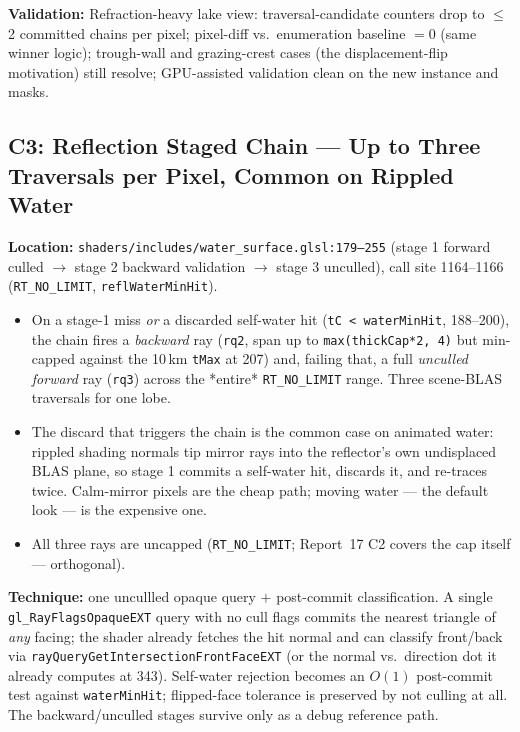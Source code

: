 \documentclass[11pt,a4paper]{article}
\begin{document}
\begin{tcolorbox}[promptbox={Prompt: Split the Scene Instance by Content and Restore Opaque Refraction}]
\textbf{Validation:} Refraction-heavy lake view: traversal-candidate counters drop to $\leq$2 committed chains per pixel; pixel-diff vs.\ enumeration baseline $=0$ (same winner logic); trough-wall and grazing-crest cases (the displacement-flip motivation) still resolve; GPU-assisted validation clean on the new instance and masks.
\end{tcolorbox}

\subsection{C3: Reflection Staged Chain --- Up to Three Traversals per Pixel, Common on Rippled Water}

\textbf{Location:} \texttt{shaders/includes/water\_surface.glsl:179--255} (stage 1 forward culled $\rightarrow$ stage 2 backward validation $\rightarrow$ stage 3 unculled), call site 1164--1166 (\texttt{RT\_NO\_LIMIT}, \texttt{reflWaterMinHit}).

\begin{itemize}
    \item On a stage-1 miss \emph{or} a discarded self-water hit (\texttt{tC < waterMinHit}, 188--200), the chain fires a \emph{backward} ray (\texttt{rq2}, span up to \texttt{max(thickCap*2, 4)} but min-capped against the 10\,km \texttt{tMax} at 207) and, failing that, a full \emph{unculled forward} ray (\texttt{rq3}) across the *entire* \texttt{RT\_NO\_LIMIT} range. Three scene-BLAS traversals for one lobe.
    \item The discard that triggers the chain is the common case on animated water: rippled shading normals tip mirror rays into the reflector's own undisplaced BLAS plane, so stage 1 commits a self-water hit, discards it, and re-traces twice. Calm-mirror pixels are the cheap path; moving water --- the default look --- is the expensive one.
    \item All three rays are uncapped (\texttt{RT\_NO\_LIMIT}; Report~17 C2 covers the cap itself --- orthogonal).
\end{itemize}

\textbf{Technique:} one uncullled opaque query $+$ post-commit classification. A single \texttt{gl\_RayFlagsOpaqueEXT} query with no cull flags commits the nearest triangle of \emph{any} facing; the shader already fetches the hit normal and can classify front/back via \texttt{rayQueryGetIntersectionFrontFaceEXT} (or the normal vs.\ direction dot it already computes at 343). Self-water rejection becomes an $O(1)$ post-commit test against \texttt{waterMinHit}; flipped-face tolerance is preserved by not culling at all. The backward/unculled stages survive only as a debug reference path.
\end{document}
